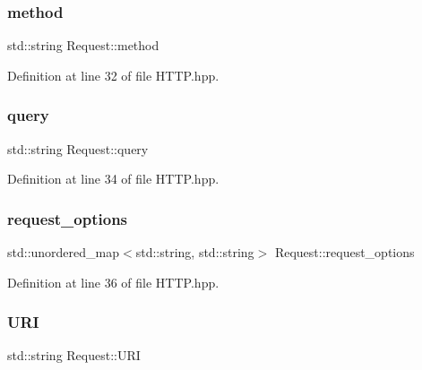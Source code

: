 \mbox{\label{class_request_ae81f481b58e82cad7808543f88290903}} 
\subsubsection{\texorpdfstring{method}{method}}
{\footnotesize\ttfamily std\+::string Request\+::method}



Definition at line 32 of file H\+T\+T\+P.\+hpp.

\mbox{\label{class_request_ab594227b55eb0af1a4f80d310a088d50}} 
\subsubsection{\texorpdfstring{query}{query}}
{\footnotesize\ttfamily std\+::string Request\+::query}



Definition at line 34 of file H\+T\+T\+P.\+hpp.

\mbox{\label{class_request_a77959ef59eada5eed1db6425ed316f8c}} 
\subsubsection{\texorpdfstring{request\+\_\+options}{request\_options}}
{\footnotesize\ttfamily std\+::unordered\+\_\+map$<$std\+::string, std\+::string$>$ Request\+::request\+\_\+options}



Definition at line 36 of file H\+T\+T\+P.\+hpp.

\mbox{\label{class_request_abe4fe525c1b9a1526c848e064c25f88b}} 
\subsubsection{\texorpdfstring{U\+RI}{URI}}
{\footnotesize\ttfamily std\+::string Request\+::\+U\+RI}



